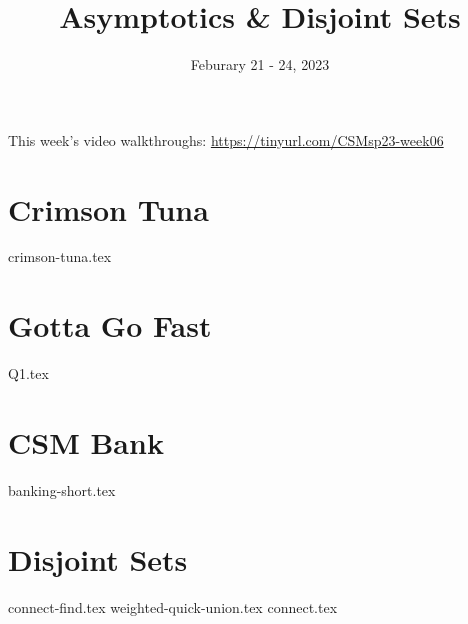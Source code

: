 \documentclass[11pt]{exam}
\title{Asymptotics \& Disjoint Sets}
\date{Feburary 21 - 24, 2023}
\begin{document}
\maketitle
This week's video walkthroughs:
\href{https://tinyurl.com/CSMsp23-week06}{https://tinyurl.com/CSMsp23-week06}


\section{Crimson Tuna}
\begin{questions}
{crimson-tuna.tex}
\end{questions}


\pagebreak
\section{Gotta Go Fast}
\begin{questions}
{Q1.tex}
\end{questions}

\pagebreak

\section{CSM Bank}
\begin{questions}
{banking-short.tex}
\end{questions}



\pagebreak
\section{Disjoint Sets}
\begin{questions}
{connect-find.tex}
{weighted-quick-union.tex}
{connect.tex}
\end{questions}
\end{document}
